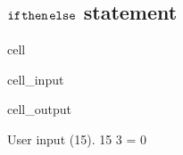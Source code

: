 \documentclass[letterpaper,10pt,italian]{jupyterBook}
\begin{document}
\subsection{\protect\(\texttt{if}\protect\)\sphinxhyphen{}\protect\(\texttt{then}\protect\)\sphinxhyphen{}\protect\(\texttt{else}\protect\) statement}
\label{\detokenize{ch/programming/flow_control:texttt-if-texttt-then-texttt-else-statement}}
\begin{sphinxuseclass}{cell}\begin{sphinxVerbatimInput}

\begin{sphinxuseclass}{cell_input}
\begin{sphinxVerbatim}[commandchars=\\\{\}]

  

            
      
          
      
                  
      
    
\end{sphinxVerbatim}

\end{sphinxuseclass}\end{sphinxVerbatimInput}
\begin{sphinxVerbatimOutput}

\begin{sphinxuseclass}{cell_output}
\begin{sphinxVerbatim}[commandchars=\\\{\}]
User input (15). 15 \PYGZpc{} 3 = 0
\end{sphinxVerbatim}

\end{sphinxuseclass}\end{sphinxVerbatimOutput}

\end{sphinxuseclass}
\end{document}
